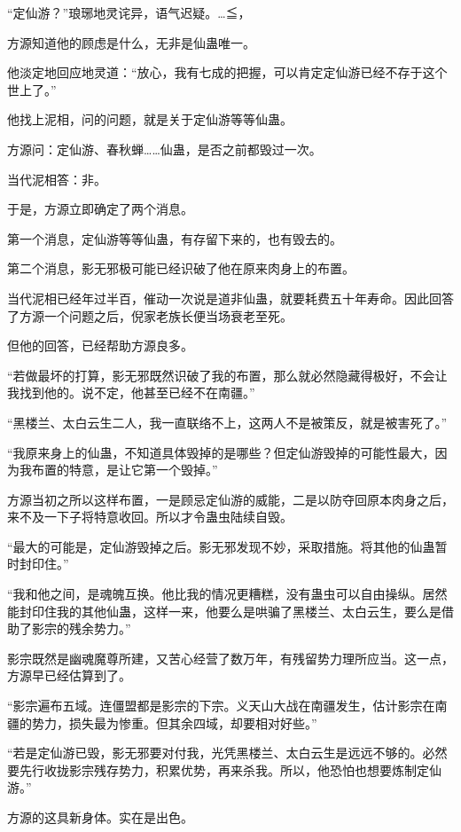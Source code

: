 
\begin{this_body}

“定仙游？”琅琊地灵诧异，语气迟疑。…≦，

方源知道他的顾虑是什么，无非是仙蛊唯一。

他淡定地回应地灵道：“放心，我有七成的把握，可以肯定定仙游已经不存于这个世上了。”

他找上泥相，问的问题，就是关于定仙游等等仙蛊。

方源问：定仙游、春秋蝉……仙蛊，是否之前都毁过一次。

当代泥相答：非。

于是，方源立即确定了两个消息。

第一个消息，定仙游等等仙蛊，有存留下来的，也有毁去的。

第二个消息，影无邪极可能已经识破了他在原来肉身上的布置。

当代泥相已经年过半百，催动一次说是道非仙蛊，就要耗费五十年寿命。因此回答了方源一个问题之后，倪家老族长便当场衰老至死。

但他的回答，已经帮助方源良多。

“若做最坏的打算，影无邪既然识破了我的布置，那么就必然隐藏得极好，不会让我找到他的。说不定，他甚至已经不在南疆。”

“黑楼兰、太白云生二人，我一直联络不上，这两人不是被策反，就是被害死了。”

“我原来身上的仙蛊，不知道具体毁掉的是哪些？但定仙游毁掉的可能性最大，因为我布置的特意，是让它第一个毁掉。”

方源当初之所以这样布置，一是顾忌定仙游的威能，二是以防夺回原本肉身之后，来不及一下子将特意收回。所以才令蛊虫陆续自毁。

“最大的可能是，定仙游毁掉之后。影无邪发现不妙，采取措施。将其他的仙蛊暂时封印住。”

“我和他之间，是魂魄互换。他比我的情况更糟糕，没有蛊虫可以自由操纵。居然能封印住我的其他仙蛊，这样一来，他要么是哄骗了黑楼兰、太白云生，要么是借助了影宗的残余势力。”

影宗既然是幽魂魔尊所建，又苦心经营了数万年，有残留势力理所应当。这一点，方源早已经估算到了。

“影宗遍布五域。连僵盟都是影宗的下宗。义天山大战在南疆发生，估计影宗在南疆的势力，损失最为惨重。但其余四域，却要相对好些。”

“若是定仙游已毁，影无邪要对付我，光凭黑楼兰、太白云生是远远不够的。必然要先行收拢影宗残存势力，积累优势，再来杀我。所以，他恐怕也想要炼制定仙游。”

方源的这具新身体。实在是出色。


\end{this_body}
